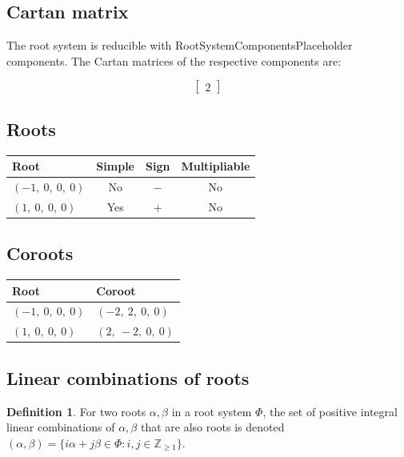 \documentclass[11pt]{article}
\theoremstyle{definition}
\newtheorem{definition}{Definition}[section]
\newif\ifrootsystemirreducible
\begin{document}
\subsection{Cartan matrix}

\ifrootsystemirreducible
The root system is irreducible and has Cartan matrix:
\else
The root system is reducible with RootSystemComponentsPlaceholder components. The Cartan matrices of the respective components are:
\fi

\[
\left[\begin{matrix}2\end{matrix}\right]
\]

\subsection{Roots}

\begin{tabular}{|l|c|c|c|}
    \hline
    \textbf{Root} & \textbf{Simple} & \textbf{Sign} & \textbf{Multipliable} \\
    \hline
    $\left( -1, \  0, \  0, \  0\right)$ & No & $-$ & No \\
    \hline
    $\left( 1, \  0, \  0, \  0\right)$ & Yes & $+$ & No \\
    \hline
\end{tabular}


\subsection{Coroots}

\begin{tabular}{|l|l|}
    \hline
    \textbf{Root} & \textbf{Coroot} \\
    \hline
    $\left( -1, \  0, \  0, \  0\right)$ & $\left( -2, \  2, \  0, \  0\right)$ \\
    \hline
    $\left( 1, \  0, \  0, \  0\right)$ & $\left( 2, \  -2, \  0, \  0\right)$ \\
    \hline
\end{tabular}


\subsection{Linear combinations of roots}

\begin{definition}
For two roots $\alpha, \beta$ in a root system $\Phi$, the set of positive integral linear combinations of $\alpha, \beta$ that are also roots is denoted
\(
	(\alpha, \beta) = \{ i \alpha + j \beta \in \Phi : i, j \in \mathbb{Z}_{\ge 1} \}
\).
\end{definition}
\end{document}
